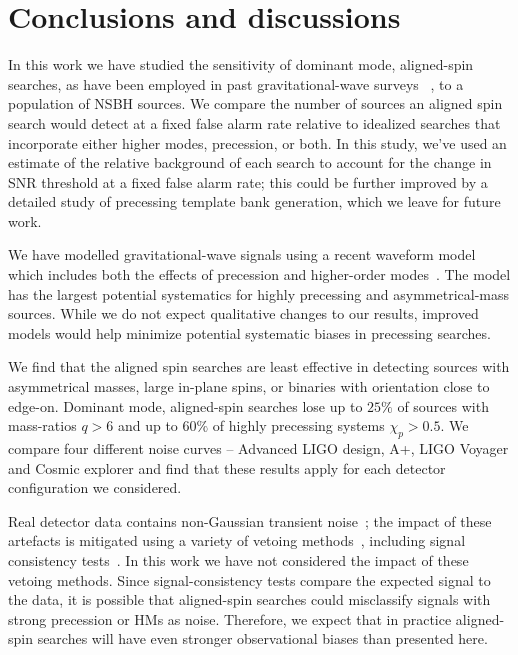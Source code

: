 \section{Conclusions and discussions}\label{sec:prec-conclusion}
In this work we have studied the sensitivity of dominant mode, aligned-spin searches, as have been employed in past gravitational-wave surveys ~\cite{LIGOScientific:2021djp, Olsen:2022pin, Nitz:2021uxj}, to a population of NSBH sources. We compare the number of sources an aligned spin search would detect at a fixed false alarm rate relative to idealized searches that incorporate either higher modes, precession, or both. In this study, we've used an estimate of the relative background of each search to account for the change in SNR threshold at a fixed false alarm rate; this could be further improved by a detailed study of precessing template bank generation, which we leave for future work.

We have modelled gravitational-wave signals using a recent waveform model which includes both the effects of precession and higher-order modes~\cite{Pratten:2020ceb}. The model has the largest potential systematics for highly precessing and asymmetrical-mass sources. While we do not expect qualitative changes to our results, improved models would help minimize potential systematic biases in precessing searches.

We find that the aligned spin searches are least effective in detecting sources with asymmetrical masses, large in-plane spins, or binaries with orientation close to edge-on. Dominant mode, aligned-spin searches lose up to $25\%$ of sources with mass-ratios $q > 6$ and up to $60\%$ of highly precessing systems $\chi_p > 0.5$. We compare four different noise curves -- Advanced LIGO design, A+, LIGO Voyager and Cosmic explorer and find that these results apply for each detector configuration we considered. 

Real detector data contains non-Gaussian transient noise~\cite{LIGOScientific:2016gtq, LIGO:2021ppb}; the impact of these artefacts is mitigated using a variety of vetoing methods~\cite{LIGOScientific:2017tza}, including signal consistency tests~\cite{Allen:2004gu, LIGOScientific:2017tza}. In this work we have not considered the impact of these vetoing methods. Since signal-consistency tests compare the expected signal to the data, it is possible that aligned-spin searches could misclassify signals with strong precession or HMs as noise. Therefore, we expect that in practice aligned-spin searches will have even stronger observational biases than presented here.


